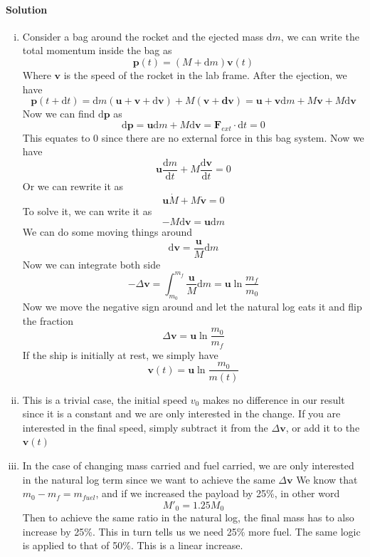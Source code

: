 \documentclass[11pt,letterpaper]{article}
\newcommand{\dydx}[2]{\frac{\text{d} #1}{\text{d} #2}}
\newcommand{\paren}[1]{\left( #1 \right)}
\newcommand{\dfl}{\text{d}}
\begin{document}
\paragraph{Solution}
\begin{enumerate}[i.]
    \item Consider a bag around the rocket and the ejected mass $\text{d}m$, we can write the total momentum inside the bag as
    \[
    \mathbf{p}(t) = \paren{M+\text{d}m}\mathbf{v}(t)
    \]
    Where $\mathbf{v}$ is the speed of the rocket in the lab frame. After the ejection, we have
    \[
    \mathbf{p}(t+\text{d}t) = \text{d}m\paren{\mathbf{u}+\mathbf{v}+\text{d}\mathbf{v}} + M\paren{\mathbf{v+\text{d}\mathbf{v}}}
    =\mathbf{u} +\mathbf{v}\text{d}m + M\mathbf{v}+M\text{d}\mathbf{v}
    \]
    Now we can find $\dfl\mathbf{p}$ as
    \[
    \dfl\mathbf{p} = \mathbf{u}\text{d}m + M\text{d}\mathbf{v} = \mathbf{F}_{ext}\cdot\dfl t = 0
    \]
    This equates to 0 since there are no external force in this bag system. Now we have
    \[
    \mathbf{u}\dydx{m}{t} + M\dydx{\mathbf{v}}{t} = 0
    \]
    Or we can rewrite it as
    \[
    \mathbf{u}\dot{M} + M\dot{\mathbf{v}} = 0
    \]
    To solve it, we can write it as
    \[
    -M\dfl\mathbf{v} = \mathbf{u}\dfl m 
    \]
    We can do some moving things around
    \[
    \dfl\mathbf{v} = \frac{\mathbf{u}}{M}\dfl m
    \]
    Now we can integrate both side
    \[
    -\Delta\mathbf{v} = \int_{m_0}^{m_f}\frac{\mathbf{u}}{M}\dfl m = \mathbf{u}\ln\frac{m_f}{m_0}
    \]
    Now we move the negative sign around and let the natural log eats it and flip the fraction
    \[
    \Delta \mathbf{v} = \mathbf{u}\ln\frac{m_0}{m_f}
    \]
    If the ship is initially at rest, we simply have
    \[
    \mathbf{v}(t) = \mathbf{u}\ln\frac{m_0}{m(t)}
    \]

    \item This is a trivial case, the initial speed $v_0$ makes no difference in our result since it is a constant and we are only interested in the change. If you are interested in the final speed, simply subtract it from the $\Delta \mathbf{v}$, or add it to the $\mathbf{v}(t)$

    \item In the case of changing mass carried and fuel carried, we are only interested in the natural log term since we want to achieve the same $\Delta \mathbf{v}$ We know that $m_0 - m_f = m_{fuel}$, and if we increased the payload by 25\%, in other word
    \[
    M'_0 = 1.25M_0
    \]
    Then to achieve the same ratio in the natural log, the final mass has to also increase by 25\%. This in turn tells us we need 25\% more fuel. The same logic is applied to that of 50\%. This is a linear increase. 


\end{enumerate}
\end{document}
